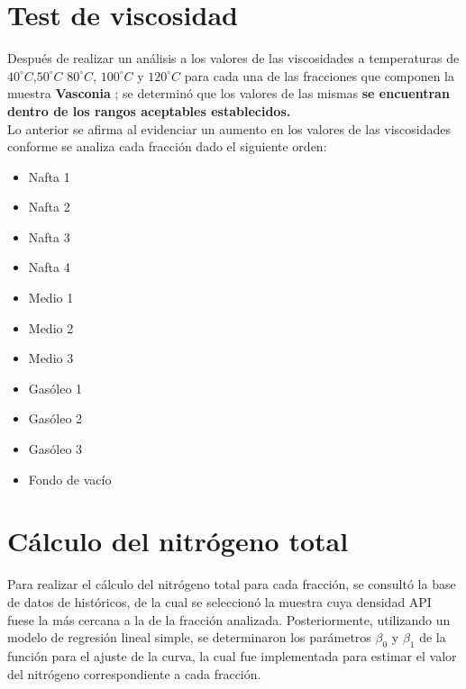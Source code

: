 \documentclass[12pt]{article}
\newcommand{\Sample}{Vasconia }
\begin{document}
\newpage
\section*{Test de viscosidad}

Después de realizar un análisis  a los valores de las viscosidades a temperaturas de $40^{\circ}C $,$50^{\circ}C $ $80^{\circ}C $, $100^{\circ}C $ y $120^{\circ}C $ para cada una de las fracciones que componen la muestra \textbf{\Sample}; se determinó que los valores de las mismas \textbf{  se encuentran dentro de los rangos aceptables  establecidos.}\\

Lo anterior se afirma al    evidenciar un aumento en los valores de las viscosidades conforme se analiza cada fracción dado el siguiente orden:

\begin{itemize}
\item Nafta 1 
\item Nafta 2
\item Nafta 3
\item Nafta 4
\item Medio 1
\item Medio 2
\item Medio 3
\item Gasóleo 1
\item Gasóleo 2
\item Gasóleo 3
\item Fondo de vacío
\end{itemize}
\newpage

\section*{Cálculo del nitrógeno total }

Para realizar el cálculo del nitrógeno total para cada fracción, se consultó la base de datos de históricos, de la cual se seleccionó la muestra cuya densidad API fuese la más cercana a la de la fracción analizada. Posteriormente, utilizando un modelo de regresión lineal simple, se determinaron los parámetros $\beta_{0}$ y $\beta_{1}$ de la función para el ajuste de la curva, la cual fue implementada para estimar  el valor del nitrógeno correspondiente a cada fracción.\\
\end{document}
